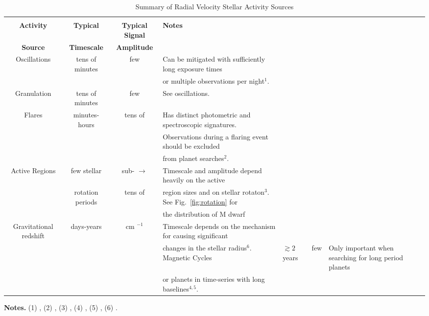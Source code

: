 \begin{table*}
\small
\renewcommand{\arraystretch}{0.7}
\caption{Summary of Radial Velocity Stellar Activity Sources}
\label{table:activity}
\begin{tabular}{cccl}
  \hline \\ [-1ex]
  \textbf{Activity} & \textbf{Typical} & \textbf{Typical Signal} & \textbf{Notes} \\
  \textbf{Source} & \textbf{Timescale} & \textbf{Amplitude} & \\
  \hline
  Oscillations & tens of minutes & few \mps{} & Can be mitigated with sufficiently long exposure times \\
  &&&or multiple observations per night$^1$. \\
  \hline
  Granulation & tens of minutes & few \mps{} & See oscillations.  \\
  \hline
  Flares & minutes-hours & tens of \mps{} & Has distinct photometric and spectroscopic signatures. \\ 
  &&&Observations during a flaring event should be excluded \\
  &&& from planet searches$^2$. \\
  \hline
  Active Regions & few stellar & sub-\mps{} $\to$ & Timescale and amplitude depend heavily on the active \\
  & rotation periods & tens of \mps{} & region sizes and on stellar rotaton$^3$. See Fig.~\ref{fig:rotation} for \\
  &&& the distribution of M dwarf  \\
  \hline
  Gravitational redshift & days-years & cm $^{-1}$ & Timescale depends on the mechanism for causing significant \\
  &&& changes in the stellar radius$^6$.
  \hline
  Magnetic Cycles & $\gtrsim 2$ years & few \mps{} & Only important when searching for long period planets \\
  &&& or planets in time-series with long baselines$^{4,5}$.
\end{tabular}
\begin{list}{}{}
\item {\bf{Notes.}}
      (1) \cite{dumusque11a}, (2) \cite{reiners09}, (3) \cite{dumusque11b}, (4) \cite{santos10},
      (5) \cite{robertson14}, (6) \cite{cegla12}. \\
\end{list}
\end{table*}
